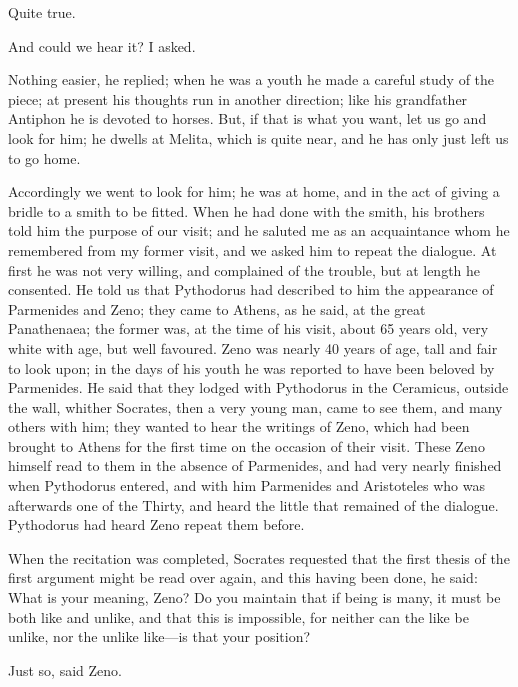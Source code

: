 \documentclass[11pt,letter]{article}
\begin{document}
\par  Quite true.

\par  And could we hear it? I asked.

\par  Nothing easier, he replied; when he was a youth he made a careful study of the piece; at present his thoughts run in another direction; like his grandfather Antiphon he is devoted to horses. But, if that is what you want, let us go and look for him; he dwells at Melita, which is quite near, and he has only just left us to go home.

\par  Accordingly we went to look for him; he was at home, and in the act of giving a bridle to a smith to be fitted. When he had done with the smith, his brothers told him the purpose of our visit; and he saluted me as an acquaintance whom he remembered from my former visit, and we asked him to repeat the dialogue. At first he was not very willing, and complained of the trouble, but at length he consented. He told us that Pythodorus had described to him the appearance of Parmenides and Zeno; they came to Athens, as he said, at the great Panathenaea; the former was, at the time of his visit, about 65 years old, very white with age, but well favoured. Zeno was nearly 40 years of age, tall and fair to look upon; in the days of his youth he was reported to have been beloved by Parmenides. He said that they lodged with Pythodorus in the Ceramicus, outside the wall, whither Socrates, then a very young man, came to see them, and many others with him; they wanted to hear the writings of Zeno, which had been brought to Athens for the first time on the occasion of their visit. These Zeno himself read to them in the absence of Parmenides, and had very nearly finished when Pythodorus entered, and with him Parmenides and Aristoteles who was afterwards one of the Thirty, and heard the little that remained of the dialogue. Pythodorus had heard Zeno repeat them before.

\par  When the recitation was completed, Socrates requested that the first thesis of the first argument might be read over again, and this having been done, he said: What is your meaning, Zeno? Do you maintain that if being is many, it must be both like and unlike, and that this is impossible, for neither can the like be unlike, nor the unlike like—is that your position?

\par  Just so, said Zeno.
\end{document}
